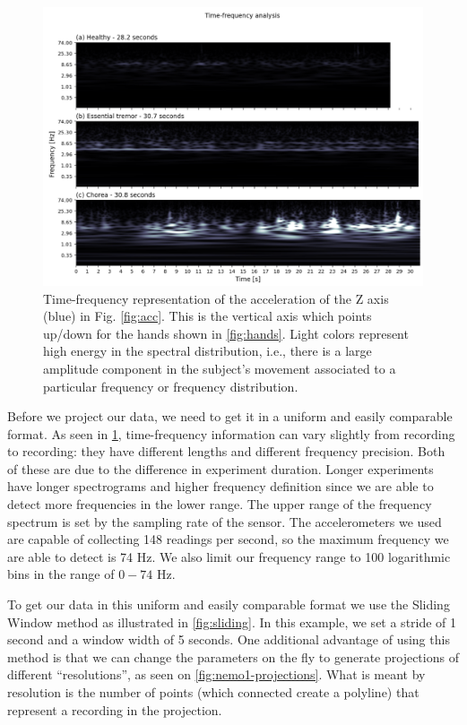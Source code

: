 
\begin{figure}[ht]
\centering
\includegraphics[width=\linewidth]{figures/nemo/freq2.png}
\caption{Time-frequency representation of the acceleration of the Z axis (blue) in Fig. \ref{fig:acc}. This is the vertical axis which points up/down for the hands shown in \cref{fig:hands}. Light colors represent high energy in the spectral distribution, i.e., there is a large amplitude component in the subject's movement associated to a particular frequency or frequency distribution. }
\label{fig:freq}
\end{figure}

Before we project our data, we need to get it in a uniform and easily comparable format. As seen in \cref{fig:freq}, time-frequency information can vary slightly from recording to recording: they have different lengths and different frequency precision. Both of these are due to the difference in experiment duration. Longer experiments have longer spectrograms and higher frequency definition since we are able to detect more frequencies in the lower range. The upper range of the frequency spectrum is set by the sampling rate of the sensor. The accelerometers we used are capable of collecting 148 readings per second, so the maximum frequency we are able to detect is 74 Hz. We also limit our frequency range to 100 logarithmic bins in the range of $0-74$ Hz. 

To get our data in this uniform and easily comparable format we use the Sliding Window method as illustrated in \cref{fig:sliding}. In this example, we set a stride of 1 second and a window width of 5 seconds. One additional advantage of using this method is that we can change the parameters on the fly to generate projections of different ``resolutions'', as seen on \cref{fig:nemo1-projections}. What is meant by resolution is the number of points (which connected create a polyline) that represent a recording in the projection.


